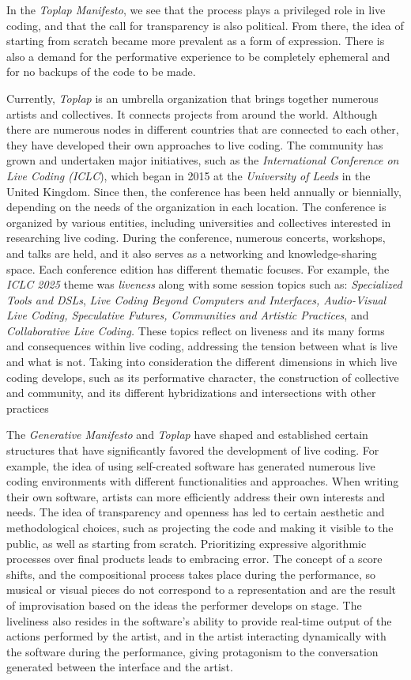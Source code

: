 \documentclass[12pt, twoside, a4paper]{report}
\begin{document}
In the \textit{Toplap Manifesto}, we see that the process plays a privileged role in live coding, and that the call for transparency is also political. From there, the idea of starting from scratch became more prevalent as a form of expression. There is also a demand for the performative experience to be completely ephemeral and for no backups of the code to be made.

Currently, \textit{Toplap} is an umbrella organization that brings together numerous artists and collectives. It connects projects from around the world. Although there are numerous nodes in different countries that are connected to each other, they have developed their own approaches to live coding. The community has grown and undertaken major initiatives, such as the \textit{International Conference on Live Coding (ICLC}), which began in 2015 at the \textit{University of Leeds} in the United Kingdom. Since then, the conference has been held annually or biennially, depending on the needs of the organization in each location. The conference is organized by various entities, including universities and collectives interested in researching live coding. During the conference, numerous concerts, workshops, and talks are held, and it also serves as a networking and knowledge-sharing space. Each conference edition has different thematic focuses. For example, the \textit{ICLC 2025} theme was \textit{liveness} along with some session topics such as: \textit{Specialized Tools and DSLs}, \textit{Live Coding Beyond Computers and Interfaces, Audio-Visual Live Coding, Speculative Futures, Communities and Artistic Practices}, and \textit{Collaborative Live Coding.} These topics reflect on liveness and its many forms and consequences within live coding, addressing the tension between what is live and what is not.  Taking into consideration the different dimensions in which live coding develops, such as its performative character, the construction of collective and community, and its different hybridizations and intersections with other practices

The \textit{Generative Manifesto} and \textit{Toplap} have shaped and established certain structures that have significantly favored the development of live coding. For example, the idea of using self-created software has generated numerous live coding environments with different functionalities and approaches. When writing their own software, artists can more efficiently address their own interests and needs. The idea of transparency and openness has led to certain aesthetic and methodological choices, such as projecting the code and making it visible to the public, as well as starting from scratch. Prioritizing expressive algorithmic processes over final products leads to embracing error. The concept of a score shifts, and the compositional process takes place during the performance, so musical or visual pieces do not correspond to a representation and are the result of improvisation based on the ideas the performer develops on stage. The liveliness also resides in the software's ability to provide real-time output of the actions performed by the artist, and in the artist interacting dynamically with the software during the performance, giving protagonism to the conversation generated between the interface and the artist.
\end{document}
